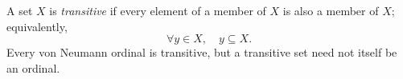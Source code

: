 
A set $X$ is \emph{transitive} if every element of a member of $X$ is also a member of $X$; equivalently,
\[
\forall y\in X,\quad y\subseteq X.
\]
Every von Neumann ordinal is transitive, but a transitive set need not itself be an ordinal.
